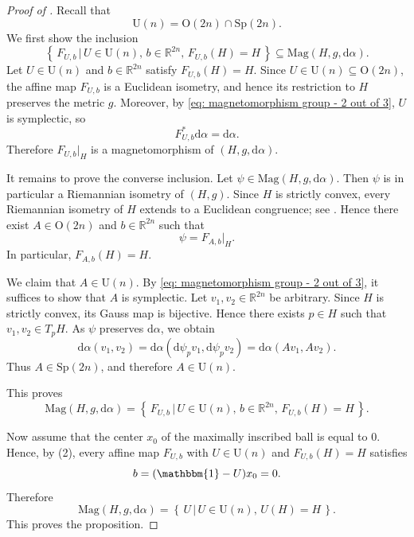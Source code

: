 \documentclass[11pt,reqno]{amsart}
\newcommand{\IR}{{\mathbb R}}%
\renewcommand{\O}{\mathrm{O}}
\theoremstyle{plain}
\theoremstyle{definition}
\numberwithin{equation}{section}
\def\d{\delta}
\def\d{\delta}
\def\d{{\mathrm{d}}}
\newcommand{\set}[2]{\left\{ \, #1  \, | \,  #2 \, \right\}}
\begin{document}
\begin{proof}[Proof of ]
Recall that
\begin{equation}
\label{eq: magnetomorphism group - 2 out of 3}
\mathrm{U}(n) = \mathrm{O}(2n) \cap \mathrm{Sp}(2n).
\end{equation}
We first show the inclusion
\[
\set{F_{U,b}}{ U \in \mathrm{U}(n),\, b \in \IR^{2n},\, F_{U,b}(H) = H }
\subseteq \mathrm{Mag}(H,g,\d\alpha).
\]
Let $U \in \mathrm{U}(n)$ and $b \in \IR^{2n}$ satisfy $F_{U,b}(H)=H$. Since $U \in \mathrm{U}(n) \subseteq \mathrm{O}(2n)$, the affine map $F_{U,b}$ is a Euclidean isometry, and hence its restriction to $H$ preserves the metric $g$. Moreover, by \eqref{eq: magnetomorphism group - 2 out of 3}, $U$ is symplectic, so
\[
F_{U,b}^*\d\alpha=\d\alpha.
\]
Therefore $F_{U,b}|_H$ is a magnetomorphism of $(H,g,\d\alpha)$.

It remains to prove the converse inclusion. Let $\psi \in \mathrm{Mag}(H,g,\d\alpha)$. Then $\psi$ is in particular a Riemannian isometry of $(H,g)$. Since $H$ is strictly convex, every Riemannian isometry of $H$ extends to a Euclidean congruence; see \cite[Thm.~V]{Sacksteder}. Hence there exist $A \in \O(2n)$ and $b \in \IR^{2n}$ such that
\[
\psi = F_{A,b}|_H.
\]
In particular, $F_{A,b}(H)=H$.

We claim that $A \in \mathrm{U}(n)$. By \eqref{eq: magnetomorphism group - 2 out of 3}, it suffices to show that $A$ is symplectic. Let $v_1,v_2 \in \IR^{2n}$ be arbitrary. Since $H$ is strictly convex, its Gauss map is bijective. Hence there exists $p \in H$ such that $v_1,v_2 \in T_pH$. As $\psi$ preserves $\d\alpha$, we obtain
\[
\d\alpha(v_1,v_2)=\d\alpha(\d\psi_pv_1,\d\psi_pv_2)=\d\alpha(Av_1,Av_2).
\]
Thus $A \in \mathrm{Sp}(2n)$, and therefore $A \in \mathrm{U}(n)$.

This proves
\[
\mathrm{Mag}(H,g,\d\alpha)=\set{F_{U,b}}{ U \in \mathrm{U}(n),\, b \in \IR^{2n},\, F_{U,b}(H) = H }.
\]

Now assume that the center $x_0$ of the maximally inscribed ball is equal to $0$. Hence, by (2), every affine map $F_{U,b}$ with $U \in \mathrm{U}(n)$ and $F_{U,b}(H)=H$ satisfies
\[
b=(\mathbbm{1}-U)x_0=0.
\]
Therefore
\[
\mathrm{Mag}(H,g,\d\alpha)=\set{U}{ U \in \mathrm{U}(n),\, U(H) = H }.
\]
This proves the proposition.
\end{proof}
\end{document}
